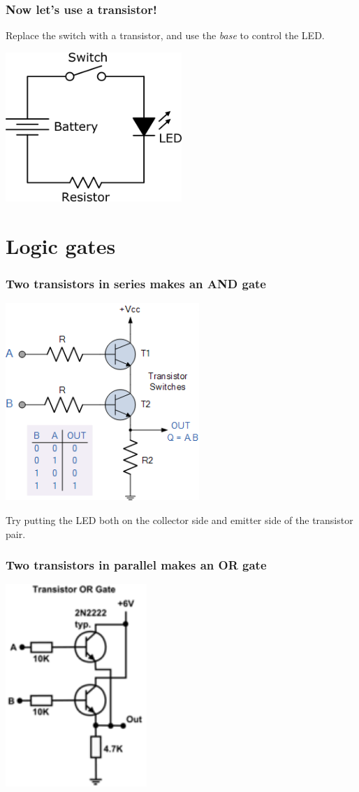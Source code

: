 \documentclass{beamer}
\begin{document}
\begin{frame}
  \frametitle{Now let's use a transistor!}
  Replace the switch with a transistor, and use the \emph{base} to control the LED.

  \begin{center}
    \includegraphics[width=0.5\textwidth]{res/led-diagram.png}
  \end{center}
\end{frame}

\section{Logic gates}

\begin{frame}
  \frametitle{Two transistors in series makes an AND gate}

  \begin{center}
    \includegraphics[width=0.55\textwidth]{res/and-transistor.png}
  \end{center}

  Try putting the LED both on the collector side and emitter side of the
  transistor pair.
\end{frame}

\begin{frame}
  \frametitle{Two transistors in parallel makes an OR gate}

  \begin{center}
    \includegraphics[width=0.4\textwidth]{res/or-gate.png}
  \end{center}
\end{frame}
\end{document}
